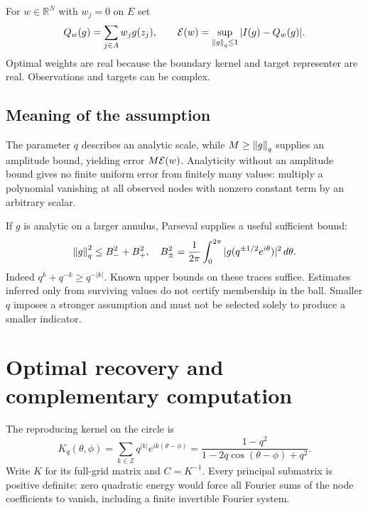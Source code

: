\documentclass[final,leqno,letterpaper]{etna}
\begin{document}
For $w\in\mathbb R^N$ with $w_j=0$ on $E$ set
\begin{equation*}
Q_w(g)=\sum_{j\in A}w_jg(z_j),\qquad
\mathcal E(w)=\sup_{\left\lVert g\right\rVert_q\le1}|I(g)-Q_w(g)|.
\end{equation*}
Optimal weights are real because the boundary kernel and target representer are real. Observations and targets can be complex.

\FloatBarrier
\subsection{Meaning of the assumption}
The parameter $q$ describes an analytic scale, while $M\ge\left\lVert g\right\rVert_q$ supplies an amplitude bound, yielding error $M\mathcal E(w)$. Analyticity without an amplitude bound gives no finite uniform error from finitely many values: multiply a polynomial vanishing at all observed nodes with nonzero constant term by an arbitrary scalar.

If $g$ is analytic on a larger annulus, Parseval supplies a useful sufficient bound:
\begin{equation*}
\left\lVert g\right\rVert_q^2\le B_-^2+B_+^2,\quad
B_\pm^2=\frac1{2\pi}\int_0^{2\pi}|g(q^{\pm1/2}e^{i\theta})|^2\,d\theta.
\end{equation*}
Indeed $q^k+q^{-k}\ge q^{-|k|}$. Known upper bounds on these traces suffice. Estimates inferred only from surviving values do not certify membership in the ball. Smaller $q$ imposes a stronger assumption and must not be selected solely to produce a smaller indicator.

\FloatBarrier
\section{Optimal recovery and complementary computation}
The reproducing kernel on the circle is
\begin{equation*}
K_q(\theta,\phi)=\sum_{k\in\mathbb Z}q^{|k|}e^{ik(\theta-\phi)}
=\frac{1-q^2}{1-2q\cos(\theta-\phi)+q^2}.
\end{equation*}
Write $K$ for its full-grid matrix and $C=K^{-1}$. Every principal submatrix is positive definite: zero quadratic energy would force all Fourier sums of the node coefficients to vanish, including a finite invertible Fourier system.
\end{document}
